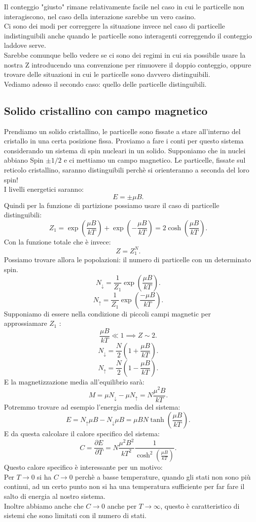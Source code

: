 Il conteggio "giusto" rimane relativamente facile nel caso in cui le particelle non interagiscono, nel caso della interazione sarebbe un vero casino.\\
Ci sono dei modi per correggere la situazione invece nel caso di particelle indistinguibili anche quando le particelle sono interagenti correggendo il conteggio laddove serve.\\
Sarebbe comunque bello vedere se ci sono dei regimi in cui sia possibile usare la nostra Z introducendo una convenzione per rimuovere il doppio conteggio, oppure trovare delle situazioni in cui le particelle sono davvero distinguibili.\\
Vediamo adesso il secondo caso: quello delle particelle distinguibili.\\
\subsection{Solido cristallino con campo magnetico}%
Prendiamo un solido cristallino, le particelle sono fissate a stare all'interno del cristallo in una certa posizione fissa. Proviamo a fare i conti per questo sistema considerando un sistema di spin nucleari in un solido. Supponiamo che in nuclei abbiano Spin $\pm 1 /2$ e ci mettiamo un campo magnetico. Le particelle, fissate sul reticolo cristallino, saranno distinguibili perchè si orienteranno a seconda del loro spin!\\
I livelli energetici saranno:
\[
	E = \pm \mu B
.\] 
Quindi per la funzione di partizione possiamo usare il caso di particelle distinguibili:
\[
	Z_1 = \exp\left( \frac{\mu B}{kT} \right) + \exp \left( - \frac{\mu B}{kT} \right) = 2 \cosh\left( \frac{\mu B}{kT} \right) 
.\] 
Con la funzione totale che è invece:
\[
	Z = Z_1^{N}
.\] 
Possiamo trovare allora le popolazioni: il numero di particelle con un determinato spin.
\[
	N_{\downarrow} = \frac{1}{Z_1}\exp{\left( \frac{\mu B}{kT} \right) }
.\] 
\[
	N_{\uparrow} = \frac{1}{Z_1}\exp{\left( \frac{-\mu B}{kT} \right) }
.\] 
Supponiamo di essere nella condizione di piccoli campi magnetic per approssiamare $Z_1$ :
\[
	\frac{\mu B}{kT}\ll 1 \implies Z\sim 2
.\] 
\[
	N_{\downarrow}=\frac{N}{2} \left( 1 + \frac{\mu B}{kT} \right) 
.\] 
\[
	N_{\uparrow}=\frac{N}{2} \left( 1 - \frac{\mu B}{kT} \right) 
.\] 
E la magnetizzazione media all'equilibrio sarà:
\[
	M = \mu N_{\downarrow} -\mu N_{\uparrow}= N \frac{\mu^2 B}{kT}
.\] 
Potremmo trovare ad esempio l'energia media del sistema:
\[
	E = N_{\uparrow}\mu B- N_{\downarrow} \mu B = \mu B N \tanh \left( \frac{\mu B}{kT} \right) 
.\]  
E da questa calcolare il calore specifico del sistema:
\[
	C = \frac{\partial E}{\partial T} = N \frac{\mu^2B^2}{kT^2} \frac{1}{\cosh^2\left( \frac{\mu B}{kT} \right) }
.\] 
Questo calore specifico è interessante per un motivo:\\
Per $T \rightarrow 0$ si ha $C \rightarrow 0$ perchè a basse temperature, quando gli stati non sono più continui, ad un certo punto non si ha una temperatura sufficiente per far fare il salto di energia al nostro sistema.\\
Inoltre abbiamo anche che $C \rightarrow 0 $ anche per $ T \rightarrow \infty$, questo è caratteristico di sistemi che sono limitati con il numero di stati. \\

